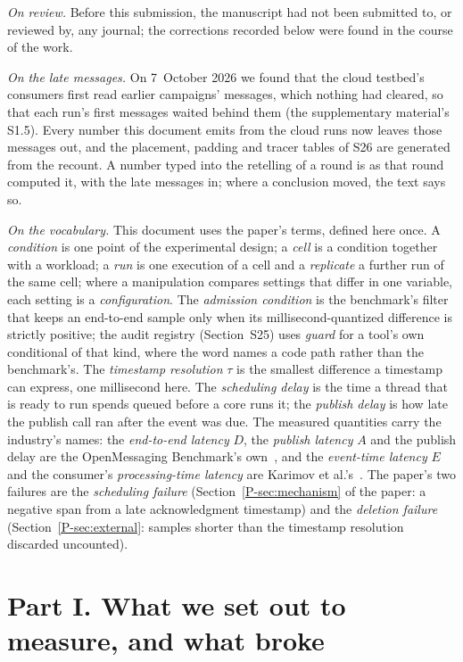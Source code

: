 \documentclass[10pt,journal,onecolumn]{IEEEtran}
\newcommand{\mainModeB}{\ref{P-sec:external}}              %
\newcommand{\mainModeA}{\ref{P-sec:mechanism}}             %
\begin{document}
\medskip
\noindent\emph{On review.} Before this submission, the manuscript had not been submitted to,
or reviewed by, any journal; the corrections recorded below were found in the course of the
work.

\medskip
\noindent\emph{On the late messages.} On 7~October 2026 we found that the cloud testbed's
consumers first read earlier campaigns' messages, which nothing had cleared, so that each run's
first messages waited behind them (the supplementary material's S1.5). Every number this document
emits from the cloud runs now leaves those messages out, and the placement, padding and tracer
tables of S26 are generated from the recount. A number typed into the retelling of a round is as
that round computed it, with the late messages in; where a conclusion moved, the text says so.

\medskip
\noindent\emph{On the vocabulary.} This document uses the paper's terms, defined here once. A
\emph{condition} is one point of the experimental design; a \emph{cell} is a condition
together with a workload; a \emph{run} is one execution of a cell and a \emph{replicate} a
further run of the same cell; where a manipulation compares settings that differ in one
variable, each setting is a \emph{configuration}. The \emph{admission condition} is the
benchmark's filter that keeps an end-to-end sample only when its millisecond-quantized
difference is strictly positive; the audit registry (Section~S25) uses \emph{guard} for a tool's
own conditional of that kind, where the word names a code path rather than the benchmark's.
The \emph{timestamp resolution} $\tau$ is the smallest difference a timestamp can express,
one millisecond here. The \emph{scheduling delay} is the time a thread that is ready to run
spends queued before a core runs it; the \emph{publish delay} is how late the publish call ran
after the event was due. The measured quantities carry the industry's names: the
\emph{end-to-end latency} $D$, the \emph{publish latency} $A$ and the publish delay are the
OpenMessaging Benchmark's own~\cite{openmessaging2018}, and the \emph{event-time latency} $E$
and the consumer's \emph{processing-time latency} are Karimov et al.'s~\cite{karimov2018benchmarking}.
The paper's two failures are the \emph{scheduling failure}
(Section~\mainModeA{} of the paper: a negative span from a late acknowledgment timestamp) and
the \emph{deletion failure} (Section~\mainModeB{}: samples shorter than the timestamp
resolution discarded uncounted).

\section*{Part I. What we set out to measure, and what broke}
\end{document}
